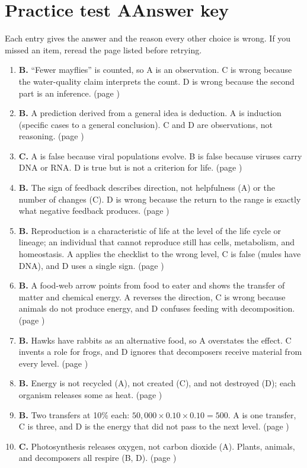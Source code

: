\documentclass[11pt,letterpaper]{article}
\newcommand{\pagechapter}[2]{\clearpage\section*{#1}\phantomsection\label{#2}\addcontentsline{toc}{section}{#1}}
\begin{document}
\pagechapter{Practice test A\quad Answer key}{testakey}
Each entry gives the answer and the reason every other choice is wrong. If you missed an item, reread the page listed before retrying.
\begin{enumerate}[itemsep=3pt]
\item \textbf{B.} ``Fewer mayflies'' is counted, so A is an observation. C is wrong because the water-quality claim interprets the count. D is wrong because the second part is an inference. (page \pageref{onea})
\item \textbf{B.} A prediction derived from a general idea is deduction. A is induction (specific cases to a general conclusion). C and D are observations, not reasoning. (page \pageref{classroom})
\item \textbf{C.} A is false because viral populations evolve. B is false because viruses carry DNA or RNA. D is true but is not a criterion for life. (page \pageref{cells})
\item \textbf{B.} The sign of feedback describes direction, not helpfulness (A) or the number of changes (C). D is wrong because the return to the range is exactly what negative feedback produces. (page \pageref{feedback})
\item \textbf{B.} Reproduction is a characteristic of life at the level of the life cycle or lineage; an individual that cannot reproduce still has cells, metabolism, and homeostasis. A applies the checklist to the wrong level, C is false (mules have DNA), and D uses a single sign. (page \pageref{lifecheck})
\item \textbf{B.} A food-web arrow points from food to eater and shows the transfer of matter and chemical energy. A reverses the direction, C is wrong because animals do not produce energy, and D confuses feeding with decomposition. (page \pageref{web})
\item \textbf{B.} Hawks have rabbits as an alternative food, so A overstates the effect. C invents a role for frogs, and D ignores that decomposers receive material from every level. (page \pageref{web})
\item \textbf{B.} Energy is not recycled (A), not created (C), and not destroyed (D); each organism releases some as heat. (page \pageref{onec})
\item \textbf{B.} Two transfers at 10\% each: $50{,}000\times0.10\times0.10=500$. A is one transfer, C is three, and D is the energy that did not pass to the next level. (page \pageref{pyramids})
\item \textbf{C.} Photosynthesis releases oxygen, not carbon dioxide (A). Plants, animals, and decomposers all respire (B, D). (page \pageref{gases})

\end{enumerate}
\end{document}
